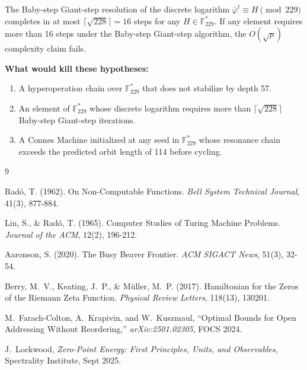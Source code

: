 \begin{hypothesis}\label{hyp:dlog}
The Baby-step Giant-step resolution of the discrete logarithm $\bar{\varphi}^t \equiv H \pmod{229}$ completes in at most $\lceil\sqrt{228}\rceil = 16$ steps for any $H \in \mathbb{F}_{229}^*$. If any element requires more than 16 steps under the Baby-step Giant-step algorithm, the $O(\sqrt{p})$ complexity claim fails.
\end{hypothesis}

\textbf{What would kill these hypotheses:}
\begin{enumerate}[noitemsep]
  \item A hyperoperation chain over $\mathbb{F}_{229}^*$ that does not stabilize by depth 57.
  \item An element of $\mathbb{F}_{229}^*$ whose discrete logarithm requires more than $\lceil\sqrt{228}\rceil$ Baby-step Giant-step iterations.
  \item A Connes Machine initialized at any seed in $\mathbb{F}_{229}^*$ whose resonance chain exceeds the predicted orbit length of 114 before cycling.
\end{enumerate}

\begin{thebibliography}{9}

Radó, T. (1962). On Non-Computable Functions. \textit{Bell System Technical Journal}, 41(3), 877-884.

Lin, S., \& Radó, T. (1965). Computer Studies of Turing Machine Problems. \textit{Journal of the ACM}, 12(2), 196-212.

Aaronson, S. (2020). The Busy Beaver Frontier. \textit{ACM SIGACT News}, 51(3), 32-54.

Berry, M.~V., Keating, J.~P., \& Müller, M.~P. (2017).
Hamiltonian for the Zeros of the Riemann Zeta Function.
\textit{Physical Review Letters}, 118(13), 130201.

M.~Farach-Colton, A.~Krapivin, and W.~Kuszmaul,
``Optimal Bounds for Open Addressing Without Reordering,''
\emph{arXiv:2501.02305}, FOCS 2024.

J.~Lockwood,
\textit{Zero-Point Energy: First Principles, Units, and Observables},
Spectrality Institute, Sept 2025.

\end{thebibliography}
